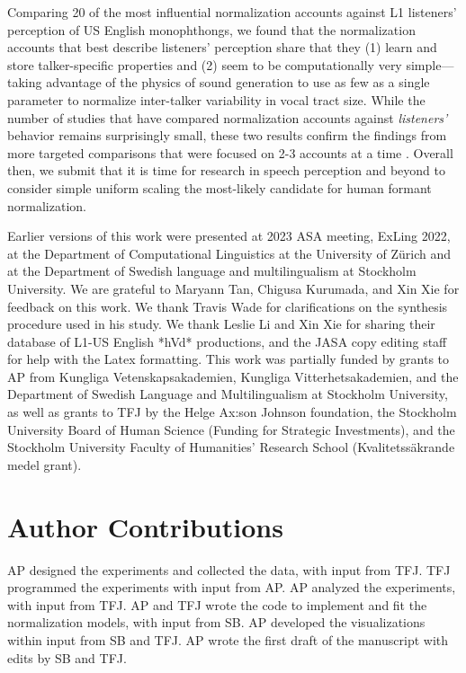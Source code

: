 \documentclass[preprint]{JASA}
\begin{document}
Comparing 20 of the most influential normalization accounts against L1 listeners' perception of US English monophthongs, we found that the normalization accounts that best describe listeners' perception share that they (1) learn and store talker-specific properties and (2) seem to be computationally very simple---taking advantage of the physics of sound generation to use as few as a single parameter to normalize inter-talker variability in vocal tract size. While the number of studies that have compared normalization accounts against \emph{listeners'} behavior remains surprisingly small, these two results confirm the findings from more targeted comparisons that were focused on 2-3 accounts at a time \citep{barreda2021, nearey1989, richter2017}. Overall then, we submit that it is time for research in speech perception and beyond to consider simple uniform scaling the most-likely candidate for human formant normalization.

\begin{acknowledgments}
Earlier versions of this work were presented at 2023 ASA meeting, ExLing 2022, at the Department of Computational Linguistics at the University of Zürich and at the Department of Swedish language and multilingualism at Stockholm University. We are grateful to Maryann Tan, Chigusa Kurumada, and Xin Xie for feedback on this work. We thank Travis Wade for clarifications on the synthesis procedure used in his study. We thank Leslie Li and Xin Xie for sharing their database of L1-US English *hVd* productions, and the JASA copy editing staff for help with the Latex formatting. This work was partially funded by grants to AP from Kungliga Vetenskapsakademien, Kungliga Vitterhetsakademien, and the Department of Swedish Language and Multilingualism at Stockholm University, as well as grants to TFJ by the Helge Ax:son Johnson foundation, the Stockholm University Board of Human Science (Funding for Strategic Investments), and the Stockholm University Faculty of Humanities’ Research School (Kvalitetssäkrande medel grant).
\end{acknowledgments}

\section*{Author Contributions}\label{author-contributions}

AP designed the experiments and collected the data, with input from TFJ. TFJ programmed the experiments with input from AP. AP analyzed the experiments, with input from TFJ. AP and TFJ wrote the code to implement and fit the normalization models, with input from SB. AP developed the visualizations within input from SB and TFJ. AP wrote the first draft of the manuscript with edits by SB and TFJ.
\end{document}
